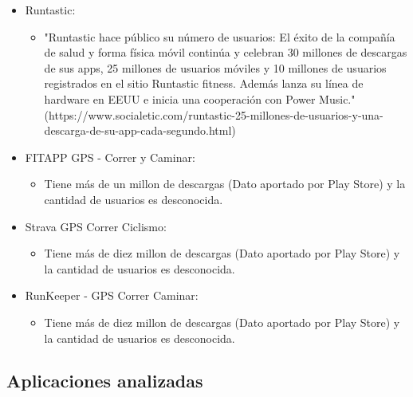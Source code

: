 \documentclass[a4paper, 11pt]{article}
\begin{document}
      \begin{itemize}
        \item{Runtastic:}
        \begin{itemize}
          \item{"Runtastic hace público su número de usuarios: El éxito de la
                 compañía de salud y forma física móvil continúa y celebran 30
                 millones de descargas de sus apps, 25 millones de usuarios
                 móviles y 10 millones de usuarios registrados en el sitio
                 Runtastic fitness. Además lanza su línea de hardware en EEUU e
                 inicia una cooperación con Power Music." (https://www.socialetic.com/runtastic-25-millones-de-usuarios-y-una-descarga-de-su-app-cada-segundo.html)}
        \end{itemize}
      \end{itemize}
      \begin{itemize}
        \item{FITAPP GPS - Correr y Caminar:}
        \begin{itemize}
          \item{Tiene más de un millon de descargas (Dato aportado por Play Store)
                y la cantidad de usuarios es desconocida.}
        \end{itemize}
      \end{itemize}
      \begin{itemize}
        \item{Strava GPS Correr Ciclismo:}
        \begin{itemize}
          \item{Tiene más de diez millon de descargas (Dato aportado por Play Store)
                y la cantidad de usuarios es desconocida.}
        \end{itemize}
      \end{itemize}
      \begin{itemize}
        \item{RunKeeper - GPS Correr Caminar:}
        \begin{itemize}
          \item{Tiene más de diez millon de descargas (Dato aportado por Play Store)
                y la cantidad de usuarios es desconocida.}
        \end{itemize}
      \end{itemize}

    \subsection{Aplicaciones analizadas}
\end{document}

